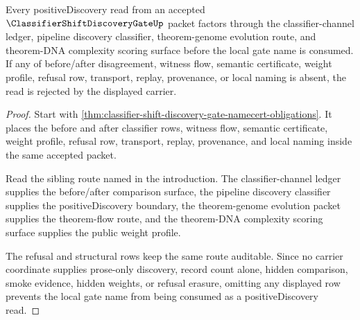 \begin{theorem}
\label{thm:classifier-shift-discovery-gate-ledger-route}
Every positiveDiscovery read from an accepted $\ClassifierShiftDiscoveryGateUp$ packet factors through the classifier-channel ledger, pipeline discovery classifier, theorem-genome evolution route, and theorem-DNA complexity scoring surface before the local gate name is consumed. If any of before/after disagreement, witness flow, semantic certificate, weight profile, refusal row, transport, replay, provenance, or local naming is absent, the read is rejected by the displayed carrier.
\end{theorem}
\begin{proof}
Start with \autoref{thm:classifier-shift-discovery-gate-namecert-obligations}. It places the before and after classifier rows, witness flow, semantic certificate, weight profile, refusal row, transport, replay, provenance, and local naming inside the same accepted packet.

Read the sibling route named in the introduction. The classifier-channel ledger supplies the before/after comparison surface, the pipeline discovery classifier supplies the positiveDiscovery boundary, the theorem-genome evolution packet supplies the theorem-flow route, and the theorem-DNA complexity scoring surface supplies the public weight profile.

The refusal and structural rows keep the same route auditable. Since no carrier coordinate supplies prose-only discovery, record count alone, hidden comparison, smoke evidence, hidden weights, or refusal erasure, omitting any displayed row prevents the local gate name from being consumed as a positiveDiscovery read.
\end{proof}



